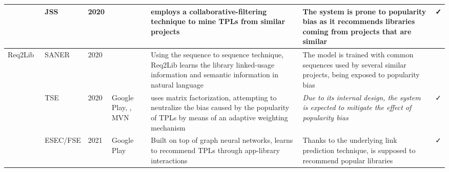 \begin{table*}[t!]
\begin{tabular}{|p{1.40cm} | p{1.1cm} | p{0.4cm} | p{1.50cm} | p{4.4cm} |p{4.4cm} | p{0.45cm} |}
		\CR~\cite{NGUYEN2019110460} & JSS & 2020 & \GH & \CR employs a collaborative-filtering technique to mine TPLs from similar projects & The system is prone to popularity bias as it recommends libraries coming from projects that are similar & \cellcolor{lightgray}\faCheck  \\ \hline
		Req2Lib~\cite{9054865}& SANER & 2020 & \GH & Using the sequence to sequence technique, Req2Lib learns the library linked-usage information and semantic
		information in natural language & The model is trained with common sequences used by several similar projects, being exposed to popularity bias  & \untick \\ \hline
		
		\LS~\cite{9043686} & TSE & 2020 & Google Play, \GH, MVN & \LS uses matrix factorization, attempting to neutralize the bias caused by the popularity of TPLs by means of an adaptive weighting mechanism  & \emph{Due to its internal design, the system is expected to mitigate the effect of popularity bias} & \cellcolor{lightgray}\faCheck \\ \hline
		\GR~\cite{10.1145/3468264.3468552} & ESEC/FSE & 2021 & Google Play  & Built on top of graph neural networks, \GR learns to recommend TPLs through app-library interactions & Thanks to the underlying link prediction technique, \GR is supposed to recommend popular libraries   & \cellcolor{lightgray}\faCheck \\ \hline
	\end{tabular}
	\label{tab:summary}
\end{table*}













